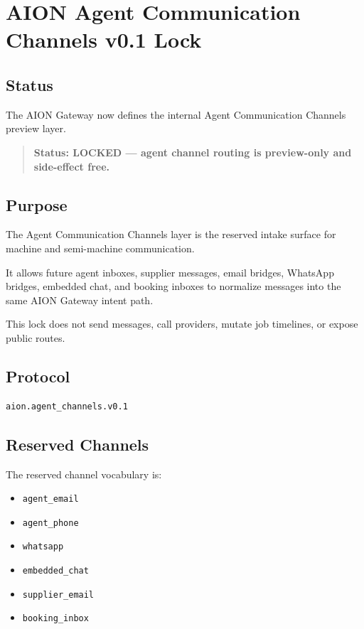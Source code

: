 \section{AION Agent Communication Channels v0.1 Lock}
\label{sec:aion-agent-channels-lock}

\subsection{Status}

The AION Gateway now defines the internal Agent Communication Channels preview layer.

\begin{quote}
\textbf{Status: LOCKED --- agent channel routing is preview-only and side-effect free.}
\end{quote}

\subsection{Purpose}

The Agent Communication Channels layer is the reserved intake surface for machine and semi-machine communication.

It allows future agent inboxes, supplier messages, email bridges, WhatsApp bridges, embedded chat, and booking inboxes to normalize messages into the same AION Gateway intent path.

This lock does not send messages, call providers, mutate job timelines, or expose public routes.

\subsection{Protocol}

\begin{verbatim}
aion.agent_channels.v0.1
\end{verbatim}

\subsection{Reserved Channels}

The reserved channel vocabulary is:

\begin{itemize}
  \item \texttt{agent\_email}
  \item \texttt{agent\_phone}
  \item \texttt{whatsapp}
  \item \texttt{embedded\_chat}
  \item \texttt{supplier\_email}
  \item \texttt{booking\_inbox}
\end{itemize}

